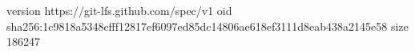 version https://git-lfs.github.com/spec/v1
oid sha256:1c9818a5348cfff12817ef6097ed85dc14806ae618ef3111d8eab438a2145e58
size 186247
